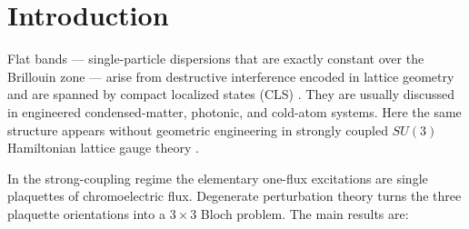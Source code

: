 \documentclass[11pt]{article}
\begin{document}
\begin{abstract}
calculus extends to every $SU(N)$ with integer $N\geq3$: in the reduced
normalization fixed by the $SU(3)$ domino,
\[
t_N=\frac{2N(N^2-4)}{(N^2-1)(4N^2-9)(2N^2-1)}>0,
\qquad t_N\sim\frac{1}{4N^3},
\]
and the group-independent incidence kernel gives a universally flat
closed-surface branch at second order. At fourth order the complete $SU(3)$
source chain is now recovered from Stage 0 through the folded des-Cloizeaux
Stage 3I and final kernel assembly Stage 3J. For every integer $N\geq7$, the
maximum local tensor degree six forces exact fundamental--antifundamental
balance, eliminating all determinant/epsilon sectors. An exact stable-rank
certificate reduces the full local problem to the $(1,1)$, $(2,2)$, and
$(3,3)$ Haar families, 140 balanced token signatures, and 94 nonvanishing
denominator polynomials. Thus the stable-rank geometry and denominator layers
are complete; the remaining load-bearing step is the symbolic walled-Brauer
contraction producing $q_N,A_N,B_N$. The $C$-even band and the $T_1^{+-}$
quantum-number assignment are also given exactly. No continuum or all-orders
claim is made.
\end{abstract}

\section{Introduction}
\label{sec:intro}

Flat bands --- single-particle dispersions that are exactly constant over the
Brillouin zone --- arise from destructive interference encoded in lattice
geometry and are spanned by compact localized states (CLS)
\cite{Sutherland1986,Lieb1989,Mielke1991,Tasaki1992,BergmanWuBalents2008,
LeykamAndreanovFlach2018}. They are usually discussed in engineered
condensed-matter, photonic, and cold-atom systems. Here the same structure
appears without geometric engineering in strongly coupled $SU(3)$
Hamiltonian lattice gauge theory \cite{KogutSusskind1975}.

In the strong-coupling regime the elementary one-flux excitations are single
plaquettes of chromoelectric flux. Degenerate perturbation theory turns the
three plaquette orientations into a $3\times3$ Bloch problem. The main
results are:
\end{document}

